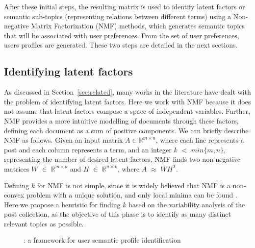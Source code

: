 After these initial steps, the resulting matrix is used to identify latent factors or semantic sub-topics (representing relations between different terms) using a Non-negative Matrix Factorization (NMF) methods, which generates semantic topics that will be associated with user preferences. From the set of user preferences, users profiles are generated. These two steps are detailed in the next sections. 


\subsection{Identifying latent factors}
\label{primaryFactors}

As discussed in Section~\ref{sec:related}, 
many works in the literature have dealt with the problem of identifying latent factors. Here we work with NMF because it does not assume that latent factors compose
a space of independent variables. Further, NMF provides a more intuitive modelling of documents through these factors, defining each document
as a sum of positive components. We can briefly describe NMF as follows. Given an input matrix $A \in \mathbb{R}^{m \times n}$,
where each line represents a post and each column represents a term, and an integer  $k$ $<$ $min\{m, n\}$, representing the number of desired latent factors, NMF finds two non-negative matrices $W$ $\in$ $\mathbb{R}^{m \times k}$ and $H$ $\in$ $\mathbb{R}^{n \times k} $, where $A$ $\approx$ $W H^T$.

Defining $k$ for NMF is not simple, since it is widely
believed that NMF is a non-convex problem with a unique solution, and only local minima can be found \cite{lin2007convergence}. Here we propose a heuristic for finding $k$ based on the variability analysis of the post collection, as the objective of this phase is to identify as many distinct relevant topics as possible.

\begin{figure}[!t]
\centering
\vspace{-0.25cm}
\caption{\method: a framework for user semantic profile identification}
\label{frameworkFig}
\vspace{-0.25cm}
\end{figure}



